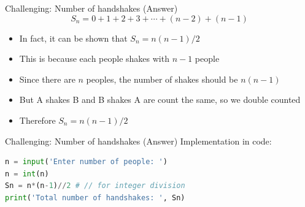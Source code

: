 \documentclass[10pt,xcolor={table,dvipsnames},t]{beamer}
\begin{document}
\begin{frame}{Challenging: Number of handshakes (Answer)}
  \begin{equation*}
    S_n = 0 + 1 + 2 + 3 + \cdots + (n-2) + (n-1)
  \end{equation*}
  \begin{itemize}
    \item In fact, it can be shown that $S_n = n(n-1)/2$
    \item This is because each people shakes with $n-1$ people
    \item Since there are $n$ peoples, the number of shakes should be $n(n-1)$
    \item But A shakes B and B shakes A are count the same, so we double counted
    \item Therefore $S_n = n(n-1)/2$
  \end{itemize} 
\end{frame}


\begin{frame}[fragile]{Challenging: Number of handshakes (Answer)}
  Implementation in code:
\begin{lstlisting}[language=python]
n = input('Enter number of people: ')
n = int(n)
Sn = n*(n-1)//2 # // for integer division
print('Total number of handshakes: ', Sn)
\end{lstlisting}
\end{frame}
\end{document}
